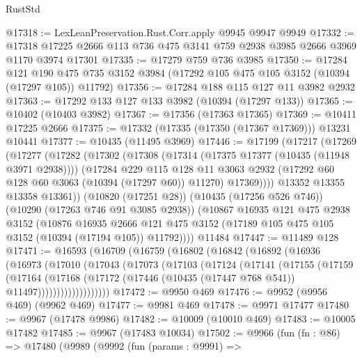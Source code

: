 \begin{lexlean}{RustStd}
\begin{coremodule}
{\begin{coremodule}
{{{{{{{{{{{{{{{{{{{{{{{{{{{{{{{{{{{{{{{{{{{{{{{{{{{{{{{{{{{{{{{{{{{{{{{{{{{{{{@17318 := LexLeanPreservation.Rust.Corr.apply @9945 @9947 @9949
@17332 := @17318 @17225 @2666 @113 @736 @475 @3141 @759 @2938 @3985 @2666 @3969 @1170 @3974 @17301
@17335 := @17279 @759 @736 @3985
@17350 := @17284
    @121
    @190
    @475
    @735
    @3152
    @3984
    (@17292 @105 @475 @105 @3152 (@10394 (@17297 @105)) @11792)
@17356 := @17284 @188 @115 @127 @11 @3982 @2932
@17363 := @17292 @133 @127 @133 @3982 (@10394 (@17297 @133))
@17365 := @10402 (@10403 @3982)
@17367 := @17356 (@17363 @17365)
@17369 := @10411 @17225 @2666
@17375 := @17332 (@17335 (@17350 (@17367 @17369))) @13231 @10441
@17377 := @10435 (@11495 @3969)
@17446 := @17199
    (@17217
      (@17269
        (@17277
          (@17282
            (@17302
              (@17308
                (@17314 (@17375 @17377 (@10435 (@11948 @3971 @2938))))
                (@17284
                  @229
                  @115
                  @128
                  @11
                  @3063
                  @2932
                  (@17292 @60 @128 @60 @3063 (@10394 (@17297 @60)) @11270)
                  @17369))))
          @13352
          @13355
          @13358
          @13361))
      (@10820 (@17251 @28))
      (@10435 (@17256 @526 @746))
      (@10290 (@17263 @746 @91 @3085 @2938))
      (@10867
        @16935
        @121
        @475
        @2938
        @3152
        (@10876
          @16935
          @2666
          @121
          @475
          @3152
          (@17189 @105 @475 @105 @3152 (@10394 (@17194 @105)) @11792))))
    @11484
@17447 := @11489 @128
@17471 := @16593
    (@16709
      (@16759
        (@16802
          (@16842
            (@16892
              (@16936
                (@16973
                  (@17010
                    (@17043
                      (@17073
                        (@17103
                          (@17124
                            (@17141
                              (@17155
                                (@17159
                                  (@17164
                                    (@17168
                                      (@17172
                                        (@17446
                                          (@10435 (@17447 @768 @541))
                                          @11497)))))))))))))))))))
@17472 := @9950 @469
@17476 := @9952 (@9956 @469) (@9962 @469)
@17477 := @9981 @469
@17478 := @9971 @17477
@17480 := @9967 (@17478 @9986)
@17482 := @10009 (@10010 @469)
@17483 := @10005 @17482
@17485 := @9967 (@17483 @10034)
@17502 := @9966
    (fun (fn : @86) =>
    @17480
      (@9989
        (@9992
          (fun (params : @9991) =>
}}}}}}}}}}}}}}}}}}}}}}}}}}}}}}}}}}}}}}}}}}}}}}}}}}}}}}}}}}}}}}}}}}}}}}}}}}}}}}
\end{coremodule}}
\end{coremodule}
\end{lexlean}

